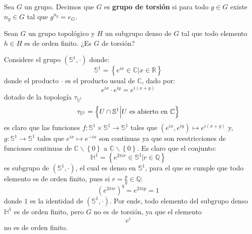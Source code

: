 \documentclass[12pt]{report}
\theoremstyle{largebreak}
\newcommand{\cf}[3]{\ensuremath{#1:#2\rightarrow#3}}
\begin{document}
    \begin{mydef}
        Sea $G$ un grupo. Decimos que $G$ es \textbf{grupo de torsión} si para todo $g\in G$ existe $n_g\in G$ tal que $g^{n_g}=e_G$.
    \end{mydef}

    \newpage

    \begin{excer}
        Sean $G$ un grupo topológico y $H$ un subgrupo denso de $G$ tal que todo elemento $h\in H$ es de orden finito. ¿Es $G$ de torsión?
    \end{excer}

    \begin{sol}
        Considere el grupo $(\mathbb{S}^1,\cdot)$ donde:
        \begin{equation*}
            \mathbb{S}^1=\left\{e^{ix}\in\mathbb{C} \Big|x\in\mathbb{R} \right\}
        \end{equation*}
        donde el producto $\cdot$ es el producto usual de $\mathbb{C}$, dado por:
        \begin{equation*}
            e^{ix}\cdot e^{iy}=e^{i(x+y)}
        \end{equation*}
        dotado de la topología $\tau_{\mathbb{S}^1}$
        \begin{equation*}
            \tau_{\mathbb{S}^1}=\left\{U\cap\mathbb{S}^1\Big| U\textup{ es abierto en }\mathbb{C} \right\}
        \end{equation*}
        es claro que las funciones $\cf{f}{\mathbb{S}^1 \times \mathbb{S}^1}{\mathbb{S}^1}$ tales que $(e^{ix},e^{iy})\mapsto e^{i(x+y)}$ y, $\cf{g}{\mathbb{S}^1}{\mathbb{S}^1}$ tales que $e^{ ix}\mapsto e^{-ix}$ son continuas ya que son reestricciones de funciones continuas de $\mathbb{C}\backslash\left\{ 0\right\}$ a $\mathbb{C}\backslash\left\{ 0\right\}$. Es claro que el conjunto:
        \begin{equation*}
            \mathbb{H}^1=\left\{e^{2\pi ir}\in\mathbb{S}^1\Big|r\in\mathbb{Q} \right\}
        \end{equation*}
        es subgrupo de $(\mathbb{S}^1,\cdot)$, el cual es denso en $\mathbb{S}^1$, para el que se cumple que todo elemento es de orden finito, pues si $r=\frac{p}{q}\in\mathbb{Q}$:
        \begin{equation*}
            (e^{2\pi ir})^q=e^{2\pi ip}=1
        \end{equation*}
        donde $1$ es la identidad de $(\mathbb{S}^1,\cdot)$. Por ende, todo elemento del subgrupo denso $\mathbb{H}^1$ es de orden finito, pero $G$ no es de torsión, ya que el elemento
        \begin{equation*}
            e^{i}
        \end{equation*}
        no es de orden finito.
    \end{sol}
\end{document}

